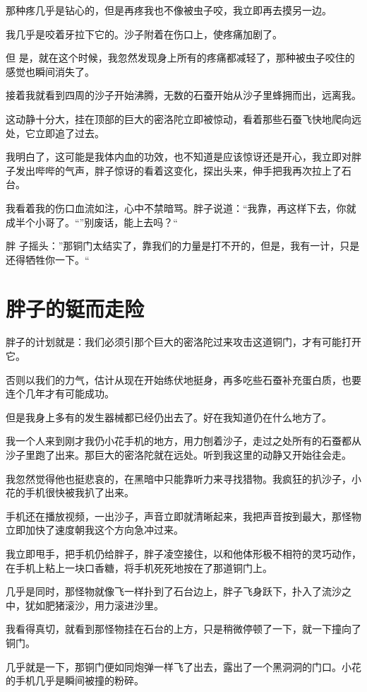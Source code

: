 那种疼几乎是钻心的，但是再疼我也不像被虫子咬，我立即再去摸另一边。

我几乎是咬着牙拉下它的。沙子附着在伤口上，使疼痛加剧了。

但 是，就在这个时候，我忽然发现身上所有的疼痛都减轻了，那种被虫子咬住的感觉也瞬间消失了。

接着我就看到四周的沙子开始沸腾，无数的石蚕开始从沙子里蜂拥而出，远离我。

这动静十分大，挂在顶部的巨大的密洛陀立即被惊动，看着那些石蚕飞快地爬向远处，它立即追了过去。

我明白了，这可能是我体内血的功效，也不知道是应该惊讶还是开心，我立即对胖子发出哔哔的气声，胖子惊讶的看着这变化，探出头来，伸手把我再次拉上了石台。

我看着我的伤口血流如注，心中不禁暗骂。胖子说道：“我靠，再这样下去，你就成半个小哥了。“”别废话，能上去吗？“

胖 子摇头：”那铜门太结实了，靠我们的力量是打不开的，但是，我有一计，只是还得牺牲你一下。“

\chapter{胖子的铤而走险}

胖子的计划就是：我们必须引那个巨大的密洛陀过来攻击这道铜门，才有可能打开它。

否则以我们的力气，估计从现在开始练伏地挺身，再多吃些石蚕补充蛋白质，也要连个几年才有可能成功。

但是我身上多有的发生器械都已经仍出去了。好在我知道仍在什么地方了。

我一个人来到刚才我仍小花手机的地方，用力刨着沙子，走过之处所有的石蚕都从沙子里跑了出来。那巨大的密洛陀就在远处。听到我这里的动静又开始往会走。

我忽然觉得他也挺悲哀的，在黑暗中只能靠听力来寻找猎物。我疯狂的扒沙子，小花的手机很快被我扒了出来。

手机还在播放视频，一出沙子，声音立即就清晰起来，我把声音按到最大，那怪物立即加快了速度朝我这个方向急冲过来。

我立即甩手，把手机仍给胖子，胖子凌空接住，以和他体形极不相符的灵巧动作，在手机上粘上一块口香糖，将手机死死地按在了那道铜门上。

几乎是同时，那怪物就像飞一样扑到了石台边上，胖子飞身跃下，扑入了流沙之中，犹如肥猪滚沙，用力滚进沙里。

我看得真切，就看到那怪物挂在石台的上方，只是稍微停顿了一下，就一下撞向了铜门。

几乎就是一下，那铜门便如同炮弹一样飞了出去，露出了一个黑洞洞的门口。小花的手机几乎是瞬间被撞的粉碎。

